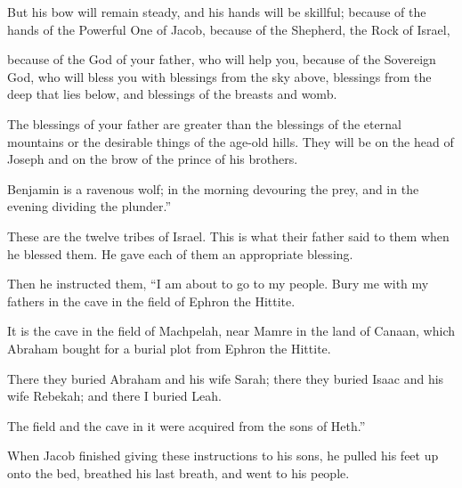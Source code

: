 \begin{scripture}
 But his bow will remain steady, and his hands will be skillful; because of the hands of the Powerful One of Jacob, because of the Shepherd, the Rock of Israel,
\everypar{}

 because of the God of your father, who will help you, because of the Sovereign God, who will bless you with blessings from the sky above, blessings from the deep that lies below, and blessings of the breasts and womb.
\everypar{}

 The blessings of your father are greater than the blessings of the eternal mountains or the desirable things of the age-old hills. They will be on the head of Joseph and on the brow of the prince of his brothers.
\everypar{}

 Benjamin is a ravenous wolf; in the morning devouring the prey, and in the evening dividing the plunder.''
\everypar{}

 These are the twelve tribes of Israel. This is what their father said to them when he blessed them. He gave each of them an appropriate blessing.
\everypar{}

 Then he instructed them, ``I am about to go to my people. Bury me with my fathers in the cave in the field of Ephron the Hittite.
 It is the cave in the field of Machpelah, near Mamre in the land of Canaan, which Abraham bought for a burial plot from Ephron the Hittite.
 There they buried Abraham and his wife Sarah; there they buried Isaac and his wife Rebekah; and there I buried Leah.
 The field and the cave in it were acquired from the sons of Heth.''
\everypar{}

 When Jacob finished giving these instructions to his sons, he pulled his feet up onto the bed, breathed his last breath, and went to his people.


\end{scripture}

